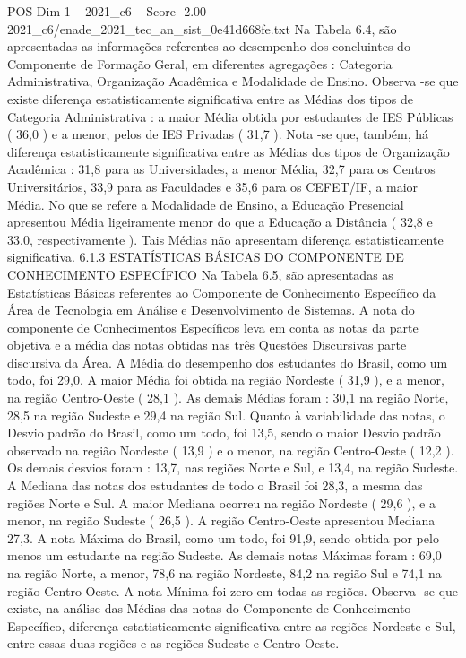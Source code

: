 \begin{textsample}{POS Dim 1 – 2021\_c6 – Score -2.00 – 2021\_c6/enade\_2021\_tec\_an\_sist\_0e41d668fe.txt}
Na Tabela 6.4, são apresentadas as informações referentes ao desempenho dos concluintes do Componente de Formação Geral, em diferentes agregações : Categoria Administrativa, Organização Acadêmica e Modalidade de Ensino.
Observa -se que existe diferença estatisticamente significativa entre as Médias dos tipos de Categoria Administrativa : a maior Média obtida por estudantes de IES Públicas ( 36,0 ) e a menor, pelos de IES Privadas ( 31,7 ).
Nota -se que, também, há diferença estatisticamente significativa entre as Médias dos tipos de Organização Acadêmica : 31,8 para as Universidades, a menor Média, 32,7 para os Centros Universitários, 33,9 para as Faculdades e 35,6 para os CEFET/IF, a maior Média.
No que se refere a Modalidade de Ensino, a Educação Presencial apresentou Média ligeiramente menor do que a Educação a Distância ( 32,8 e 33,0, respectivamente ).
Tais Médias não apresentam diferença estatisticamente significativa. 6.1.3 ESTATÍSTICAS BÁSICAS DO COMPONENTE DE CONHECIMENTO ESPECÍFICO Na Tabela 6.5, são apresentadas as Estatísticas Básicas referentes ao Componente de Conhecimento Específico da Área de Tecnologia em Análise e Desenvolvimento de Sistemas.
A nota do componente de Conhecimentos Específicos leva em conta as notas da parte objetiva e a média das notas obtidas nas três Questões Discursivas parte discursiva da Área.
A Média do desempenho dos estudantes do Brasil, como um todo, foi 29,0.
A maior Média foi obtida na região Nordeste ( 31,9 ), e a menor, na região Centro-Oeste ( 28,1 ).
As demais Médias foram : 30,1 na região Norte, 28,5 na região Sudeste e 29,4 na região Sul.
Quanto à variabilidade das notas, o Desvio padrão do Brasil, como um todo, foi 13,5, sendo o maior Desvio padrão observado na região Nordeste ( 13,9 ) e o menor, na região Centro-Oeste ( 12,2 ).
Os demais desvios foram : 13,7, nas regiões Norte e Sul, e 13,4, na região Sudeste.
A Mediana das notas dos estudantes de todo o Brasil foi 28,3, a mesma das regiões Norte e Sul.
A maior Mediana ocorreu na região Nordeste ( 29,6 ), e a menor, na região Sudeste ( 26,5 ).
A região Centro-Oeste apresentou Mediana 27,3.
A nota Máxima do Brasil, como um todo, foi 91,9, sendo obtida por pelo menos um estudante na região Sudeste.
As demais notas Máximas foram : 69,0 na região Norte, a menor, 78,6 na região Nordeste, 84,2 na região Sul e 74,1 na região Centro-Oeste.
A nota Mínima foi zero em todas as regiões.
Observa -se que existe, na análise das Médias das notas do Componente de Conhecimento Específico, diferença estatisticamente significativa entre as regiões Nordeste e Sul, entre essas duas regiões e as regiões Sudeste e Centro-Oeste.

\end{textsample}
